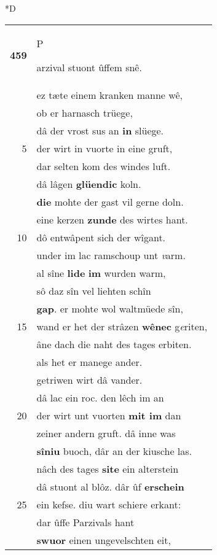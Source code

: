 \documentclass[8pt,a4paper,notitlepage]{article}
\begin{document}
\begin{table}[ht]
\begin{minipage}[t]{0.5\linewidth}
\small
\begin{center}*D
\end{center}
\begin{tabular}{rl}
\textbf{459} & \begin{large}P\end{large}arzival stuont ûffem snê.\\ 
 & ez tæte einem kranken manne wê,\\ 
 & ob er harnasch trüege,\\ 
 & dâ der vrost sus an \textbf{in} slüege.\\ 
5 & der wirt in vuorte in eine gruft,\\ 
 & dar selten kom des windes luft.\\ 
 & dâ lâgen \textbf{glüendic} koln.\\ 
 & \textbf{die} mohte der gast vil gerne doln.\\ 
 & eine kerzen \textbf{zunde} des wirtes hant.\\ 
10 & dô entwâpent sich der wîgant.\\ 
 & under im lac ramschoup unt \textit{v}arm.\\ 
 & al sîne \textbf{lide} \textbf{im} wurden warm,\\ 
 & sô daz sîn vel liehten schîn\\ 
 & \textbf{gap}. er mohte wol waltmüede sîn,\\ 
15 & wand er het der strâzen \textbf{wênec} g\textit{e}riten,\\ 
 & âne dach die naht des tages erbiten.\\ 
 & als het er manege ander.\\ 
 & getriwen wirt dâ vander.\\ 
 & dâ lac ein roc. den lêch im an\\ 
20 & der wirt unt vuorten \textbf{mit im} dan\\ 
 & zeiner andern gruft. dâ inne was\\ 
 & \textbf{sîniu} buoch, dâr an der kiusche las.\\ 
 & nâch des tages \textbf{site} ein alterstein\\ 
 & dâ stuont al blôz. dâr ûf \textbf{erschein}\\ 
25 & ein kefse. diu wart schiere erkant:\\ 
 & dar ûffe Parzivals hant\\ 
 & \textbf{swuor} einen ungevelschten eit,\\ 

\end{tabular}
\end{minipage}
\end{table}
\end{document}
